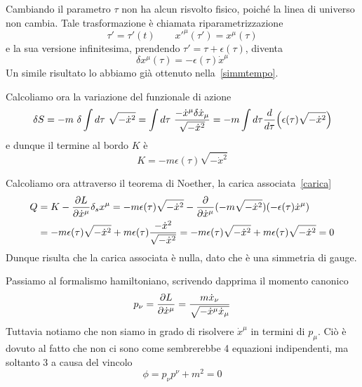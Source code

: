     Cambiando il parametro $\tau$ non ha alcun risvolto fisico, poiché la linea di universo non cambia. Tale trasformazione è chiamata riparametrizzazione
    \begin{equation*}
        \tau' = \tau'(t) \qquad x'^\mu (\tau') = x^\mu(\tau)
    \end{equation*} 
    e la sua versione infinitesima, prendendo $\tau' = \tau + \epsilon(\tau)$, diventa
    \begin{equation*}
        \delta x^\mu(\tau) = - \epsilon(\tau) \dot x^\mu
    \end{equation*}
    Un simile risultato lo abbiamo già ottenuto nella~\eqref{simmtempo}.
    
    Calcoliamo ora la variazione del funzionale di azione 
    \begin{equation*}
        \delta S = - m ~ \delta \int d\tau ~ \sqrt{- \dot x^2} = \int d\tau ~ \frac{- \dot x^\mu \delta \dot x_\mu}{\sqrt{- \dot x^2}} = - m \int d\tau \frac{d}{d\tau} \Big ( \epsilon(\tau) \sqrt{- \dot x^2} \Big)
    \end{equation*}
    e dunque il termine al bordo $K$ è 
    \begin{equation*}
        K = - m \epsilon(\tau) \sqrt{- \dot x^2}
    \end{equation*}

    Calcoliamo ora attraverso il teorema di Noether, la carica associata~\eqref{carica}
    \begin{equation*}
    \begin{aligned}
        Q & = K - \frac{\partial L}{\partial\dot x^\mu} \delta_s x^\mu =  - m \epsilon(\tau) \sqrt{- \dot x^2} - \frac{\partial}{\partial\dot x^\mu} (- m \sqrt{- \dot x^2} ) (- \epsilon(\tau) \dot x^\mu) \\ & = - m \epsilon(\tau) \sqrt{- \dot x^2} + m \epsilon(\tau) \frac{- \dot x^2}{\sqrt{- \dot x^2}} = - m \epsilon(\tau) \sqrt{- \dot x^2} + m \epsilon(\tau) \sqrt{- \dot x^2} = 0
    \end{aligned}
    \end{equation*}
    Dunque risulta che la carica associata è nulla, dato che è una simmetria di gauge. 

    Passiamo al formalismo hamiltoniano, scrivendo dapprima il momento canonico 
\begin{equation*}
    p_\nu = \frac{\partial L}{\partial\dot x^\mu} = \frac{m \dot x_\nu}{\sqrt{- \dot x^\mu \dot x_\mu}}
\end{equation*}
    Tuttavia notiamo che non siamo in grado di risolvere $\dot x^\mu$ in termini di $p_\mu$. Ciò è dovuto al fatto che non ci sono come sembrerebbe 4 equazioni indipendenti, ma soltanto 3 a causa del vincolo 
\begin{equation*}
    \phi = p_\nu p^\nu + m^2 = 0
\end{equation*}

